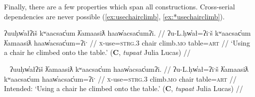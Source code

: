 Finally, there are a few properties which span all constructions. Cross-serial dependencies are never possible (\ref{ex:usechairclimb}, \ref{ex:*usechairclimb}).

\ex \label{ex:usechairclimb}
\begingl
\glpreamble ʔuuḥw̓ałʔiš kʷaacsac̓um ƛ̓amaasiƛ haaw̓acsac̓umʔi. //
\gla ʔu-L.ḥw̓ał=ʔiˑš kʷaacsac̓um ƛ̓amaasiƛ haaw̓acsac̓um=ʔiˑ //
\glb \textsc{x}-use=\textsc{strg.3} chair climb.\textsc{mo} table=\textsc{art} //
\glft `Using a chair he climbed onto the table.' (\textbf{C}, \textit{tupaat} Julia Lucas) //
\endgl
\xe

\ex~ \label{ex:*usechairclimb}
\begingl
\glpreamble *ʔuuḥw̓ałʔiš ƛ̓amaasiƛ kʷaacsac̓um haaw̓acsac̓umʔi. //
\gla ʔu-L.ḥw̓ał=ʔiˑš ƛ̓amaasiƛ kʷaacsac̓um haaw̓acsac̓um=ʔiˑ //
\glb \textsc{x}-use=\textsc{strg.3} climb.\textsc{mo} chair table=\textsc{art} //
\glft Intended: `Using a chair he climbed onto the table.' (\textbf{C}, \textit{tupaat} Julia Lucas) //
\endgl
\xe






\begin{comment}
Something similar happened with Sophie Billy. Sentence () is from a translation text she has been working on, and I asked about rephrases () and (). While I was interpreting () as manner and action (Type I), I think she, in the context of the story, saw them as sequential (Type V): lead and then bring back. In this context, the reordering of () is nonsense: One cannot bring someone back and then lead them.

\ex \label{ex:leadbringback}
\begingl
\glpreamble m̓aw̓aaƛint ḥaaw̓iłƛisi huʔacap̓ƛ. //
\gla m̓aw̓aa=!aƛ=int ḥaaw̓iłƛ=ʔis=ʔiˑ huʔa-ci-!ap=!aƛ //
\glb lead=\textsc{now}=\textsc{pst} young.man=\textsc{dim}=\textsc{art} back-go=\textsc{caus}\textsc{now} //
\glft `She led the young man and took him back.' (\textbf{Q}, Sophie Billy) //
\endgl
\xe

NB: This is due to obj-verb ordering of ex. 3
BM
yaacukw̓it̓asaḥ waałak c̓uumaʕas
*yaacukw̓it̓asaḥ c̓uumaʕas
*yaacukw̓it̓asaḥ c̓uumaʕas waałak


NB: This may be due to the !aƛ forcing a two-sentence interpretation
SB
m̓aw̓aaƛint ḥaaw̓iłƛisi huʔacap̓ƛ
m̓aw̓aaƛint huʔacap̓ƛ ḥaaw̓iłƛisi
*huʔacap̓ƛint m̓aw̓aaƛ ḥaaw̓iłƛisi 
\end{comment}

